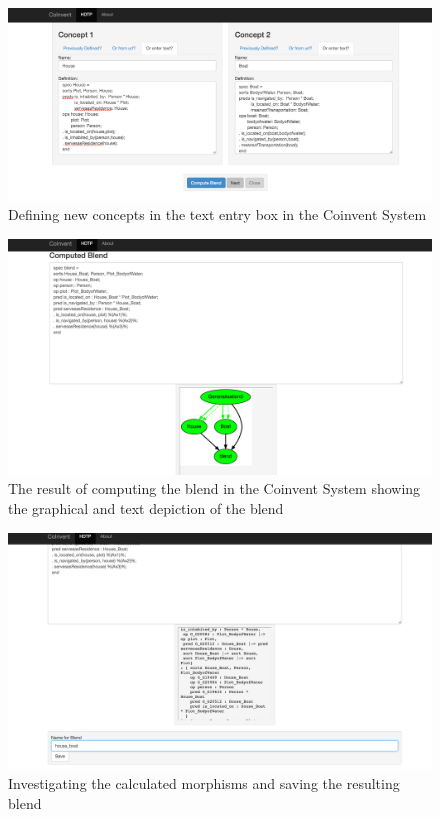 \begin{figure}[!h]
\label{fig:ss3}
\begin{center}
\includegraphics[width=\textwidth]{ss3.png}
\end{center}
\caption{Defining new concepts in the text entry box in the Coinvent System}
\end{figure}

\begin{figure}[!h]
\label{fig:ss4}
\begin{center}
\includegraphics[width=\textwidth]{ss4.png}
\end{center}
\caption{The result of computing the blend in the Coinvent System showing the graphical and text depiction of the blend}
\end{figure}

\begin{figure}[!h]
\label{fig:ss5}
\begin{center}
\includegraphics[width=\textwidth]{ss5.png}
\end{center}
\caption{Investigating the calculated morphisms and saving the resulting blend}
\end{figure}

